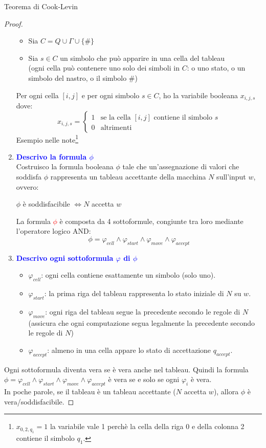 \documentclass{article}  %
\theoremstyle{definition}
\begin{document}
\begin{theorem}{Teorema di Cook-Levin}
\begin{proof}
\begin{enumerate}
\begin{itemize}
				      \item Sia $C= Q \cup \Gamma \cup \{\#\}$
				      \item Sia $s \in C$ un simbolo che può apparire in una cella del tableau \\ (ogni cella può contenere uno solo dei simboli in $C$:
				            o uno stato, o un simbolo del nastro, o il simbolo \#)
			      \end{itemize}
			      Per ogni cella $[i,j]$ e per ogni simbolo $s \in C$, ho la variabile booleana $x_{i,j,s}$ dove:
			      \[
				      x_{i,j,s} =
				      \begin{cases}
					      1 & \text{se la cella } [i,j] \text{ contiene il simbolo } s \\
					      0 & \text{altrimenti}
				      \end{cases}
			      \]
			      Esempio nelle note\footnote{$x_{0,2,q_1}=1$ la variabile vale 1 perchè la cella della riga 0 e della colonna 2 contiene il simbolo $q_1$.}
			\item \textcolor{blue}{\textbf{Descrivo la formula $\phi$}} \\
			      Costruisco la formula booleana $\phi$ tale che un'assegnazione di valori che soddisfa $\phi$ rappresenta un tableau accettante della macchina $N$ sull'input $w$, ovvero:
			      \begin{center}
				      $\phi$ è soddisfacibile $\iff N$ accetta $w$
			      \end{center}
			      La formula \textcolor{red}{$\phi$} è composta da 4 sottoformule, congiunte tra loro mediante l'operatore logico AND:
			      \[
				      \phi = \varphi_{cell} \land \varphi_{start} \land \varphi_{move} \land \varphi_{accept}
			      \]
			\item \textcolor{blue}{\textbf{Descrivo ogni sottoformula $\varphi$ di $\phi$}}
			      \begin{itemize}
				      \item $\varphi_{cell}$:  ogni cella contiene esattamente un simbolo (solo uno).
				      \item $\varphi_{start}$: la prima riga del tableau rappresenta lo stato iniziale di $N$ su $w$.
				      \item $\varphi_{move}$:  ogni riga del tableau segue la precedente secondo le regole di $N$
				            (assicura che ogni computazione segua legalmente la precedente secondo le regole di $N$)
				      \item $\varphi_{accept}$: almeno in una cella appare lo stato di accettazione $q_{accept}$.
			      \end{itemize}
		\end{enumerate}
		Ogni sottoformula diventa vera se è vera anche nel tableau.
		Quindi la formula $\phi = \varphi_{cell} \land \varphi_{start} \land \varphi_{move} \land \varphi_{accept}$ è vera
		se e solo se ogni $\varphi_i$ è vera. \\
		In poche parole, se il tableau è un tableau accettante ($N$ accetta $w$), allora $\phi$ è vera/soddisfacibile.


\end{proof}
\end{theorem}
\end{document}
